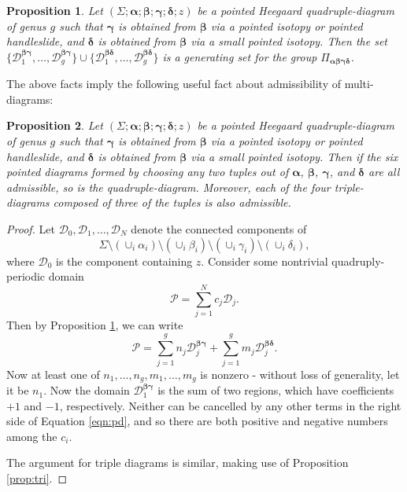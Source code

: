 \documentclass[11pt]{article}
\theoremstyle{plain} \newtheorem{thm}{Theorem}[subsection]
\theoremstyle{plain} \newtheorem{cor}[thm]{Corollary}
\theoremstyle{plain} \newtheorem{prop}[thm]{Proposition}
\theoremstyle{plain} \newtheorem{conj}[thm]{Conjecture}
\theoremstyle{plain} \newtheorem{lem}[thm]{Lemma}
\theoremstyle{definition} \newtheorem{df}[thm]{Definition}
\theoremstyle{remark} \newtheorem{rmk}[thm]{Remark}
\theoremstyle{remark} \newtheorem{obs}[thm]{Observation}
\newcommand{\DD}{\mathcal{D}}
\newcommand{\Dbg}[1]{\DD^{\bb\bg}_{#1}}
\newcommand{\Dbd}[1]{\DD^{\bb\bd}_{#1}}
\newcommand{\Pabgd}{\Pi_{\ba\bb\bg\bd}}
\newcommand{\ba}{\boldsymbol{\alpha}}
\newcommand{\bb}{\boldsymbol{\beta}}
\newcommand{\bg}{\boldsymbol{\gamma}}
\newcommand{\bd}{\boldsymbol{\delta}}
\begin{document}
\begin{prop}\label{prop:quad}
Let $\left(\Sigma; \ba; \bb; \bg; \bd; z\right)$ be a pointed Heegaard quadruple-diagram of genus $g$ such that $\bg$ is obtained from $\bb$ via a pointed isotopy or pointed handleslide, and  $\bd$  is obtained from $\bb$ via a small pointed isotopy.  Then the set $\{ \Dbg{1} , \ldots, \Dbg{g}\} \cup \{ \Dbd{1} , \ldots, \Dbd{g}\}$ is a generating set for the group $\Pabgd$.
\end{prop}

The above facts imply the following useful fact about admissibility of multi-diagrams:

\begin{prop}\label{prop:adm}
Let $\left(\Sigma; \ba; \bb; \bg; \bd; z\right)$ be a pointed Heegaard quadruple-diagram of genus $g$  such that $\bg$ is obtained from $\bb$ via a pointed isotopy or pointed handleslide, and  $\bd$  is obtained from $\bb$ via a small pointed isotopy.  Then if the six pointed diagrams formed by choosing any two tuples out of $\ba$, $\bb$, $\bg$, and $\bd$ are all admissible, so is the quadruple-diagram.  Moreover, each of the four triple-diagrams composed of three of the tuples is also admissible.
\end{prop}

\begin{proof}
Let $\mathcal{D}_0, \mathcal{D}_1, \ldots, \mathcal{D}_N$ denote the connected components of
$$ \Sigma \setminus \left( \cup_{i} \alpha_i \right)\setminus \left( \cup_{i} \beta_i \right)\setminus \left( \cup_{i} \gamma_i \right)\setminus \left( \cup_{i} \delta_i \right),$$
where $\mathcal{D}_0$ is the component containing $z$.
Consider some nontrivial quadruply-periodic domain
$$ \mathcal{P} = \sum_{j = 1}^N c_j \mathcal{D}_j.$$
Then by Proposition \ref{prop:quad}, we can write
\begin{equation}\label{eqn:pd}
\mathcal{P} = \sum_{j = 1}^g  n_j \Dbg{j} + \sum_{j=1}^{g} m_j \Dbd{j}.
\end{equation}
Now at least one of $n_1, \ldots, n_g, m_1, \ldots, m_g$ is nonzero - without loss of generality, let it be $n_1$.  Now the domain $\Dbg{1}$ is the sum of two regions, which have coefficients $+1$ and $-1$, respectively.  Neither can be cancelled by any other terms in the right side of Equation \ref{eqn:pd}, and so there are both positive and negative numbers among the $c_i$.

The argument for triple diagrams is similar, making use of Proposition \ref{prop:tri}.
\end{proof}
\end{document}
